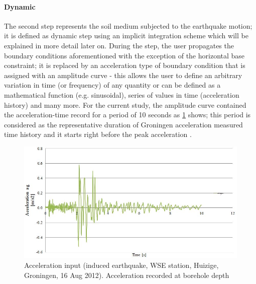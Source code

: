 	\paragraph{Dynamic}
	The second step represents the soil medium subjected to the earthquake motion; it is defined as dynamic step using an implicit integration scheme which will be explained in more detail later on. During the step, the user propagates the boundary conditions aforementioned with the exception of the horizontal base constraint; it is replaced by an acceleration type of boundary condition that is assigned with an amplitude curve - this allows the user to define an arbitrary variation in time (or frequency) of any quantity or can be defined as a mathematical function (e.g. sinusoidal), series of values in time (acceleration history) and many more. For the current study, the amplitude curve contained the acceleration-time record for a period of 10 seconds as \ref{Acceleration} shows; this period is considered as the representative duration of Groningen acceleration measured time history and it starts right before the peak acceleration \cite{dost2004scaling}. 
	
	\begin{figure}[h!]
		\centering
		\includegraphics[width=0.8\linewidth]{"Acc input"}
		\caption{Acceleration input (induced earthquake, WSE station, Huizige, Groningen, 16 Aug 2012). Acceleration recorded at borehole depth}
		\label{Acceleration}
	\end{figure}
	
	\newpage
